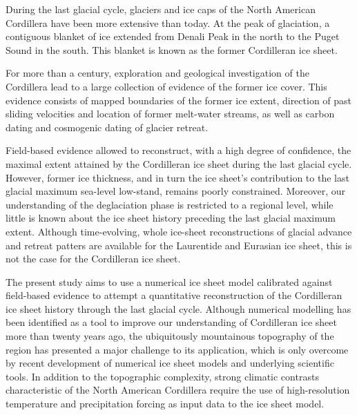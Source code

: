 \documentclass[tc, ms]{copernicus}
\begin{document}
\introduction
\label{sec:intro}

During the last glacial cycle, glaciers and ice caps of the North American
Cordillera have been more extensive than today. At the peak of glaciation, a
contiguous blanket of ice extended from Denali Peak in the north to the Puget
Sound in the south. This blanket is known as the former Cordilleran ice sheet.

For more than a century, exploration and geological investigation of the
Cordillera lead to a large collection of evidence of the former ice cover. This
evidence consists of mapped boundaries of the former ice extent, direction of
past sliding velocities and location of former melt-water streams, as well as
carbon dating and cosmogenic dating of glacier retreat.

Field-based evidence allowed to reconstruct, with a high degree of confidence,
the maximal extent attained by the Cordilleran ice sheet during the last
glacial cycle. However, former ice thickness, and in turn the ice sheet's
contribution to the last glacial maximum sea-level low-stand, remains poorly
constrained. Moreover, our understanding of the deglaciation phase is
restricted to a regional level, while little is known about the ice sheet
history preceding the last glacial maximum extent. Although time-evolving,
whole ice-sheet reconstructions of glacial advance and retreat patters are
available for the Laurentide and Eurasian ice sheet, this is not the case for
the Cordilleran ice sheet.

The present study aims to use a numerical ice sheet model calibrated against
field-based evidence to attempt a quantitative reconstruction of the
Cordilleran ice sheet history through the last glacial cycle. Although
numerical modelling has been identified as a tool to improve our understanding
of Cordilleran ice sheet more than twenty years ago, the ubiquitously
mountainous topography of the region has presented a major challenge to its
application, which is only overcome by recent development of numerical ice
sheet models and underlying scientific tools. In addition to the topographic
complexity, strong climatic contrasts characteristic of the North American
Cordillera require the use of high-resolution temperature and precipitation
forcing as input data to the ice sheet model.
\end{document}
